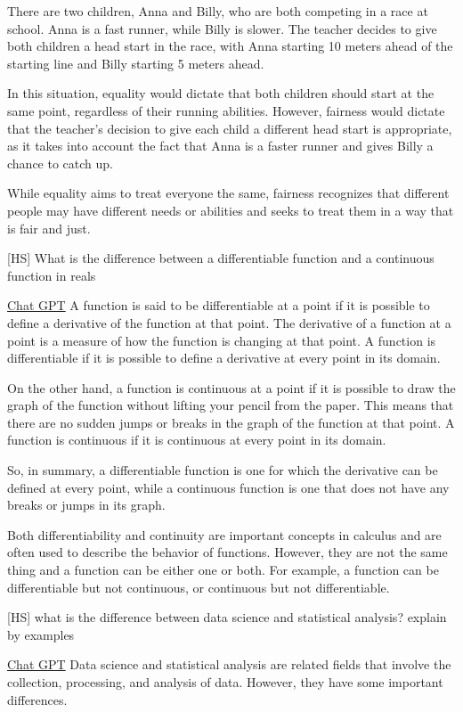 \documentclass[
]{book}
\theoremstyle{definition}
\theoremstyle{definition}
\theoremstyle{definition}
\theoremstyle{definition}
\theoremstyle{remark}
\begin{document}
There are two children, Anna and Billy, who are both competing in a race at school. Anna is a fast runner, while Billy is slower. The teacher decides to give both children a head start in the race, with Anna starting 10 meters ahead of the starting line and Billy starting 5 meters ahead.

In this situation, equality would dictate that both children should start at the same point, regardless of their running abilities. However, fairness would dictate that the teacher's decision to give each child a different head start is appropriate, as it takes into account the fact that Anna is a faster runner and gives Billy a chance to catch up.

While equality aims to treat everyone the same, fairness recognizes that different people may have different needs or abilities and seeks to treat them in a way that is fair and just.

{[}HS{]} What is the difference between a differentiable function and a continuous function in reals

\protect\hyperlink{chatgpt}{Chat GPT} A function is said to be differentiable at a point if it is possible to define a derivative of the function at that point. The derivative of a function at a point is a measure of how the function is changing at that point. A function is differentiable if it is possible to define a derivative at every point in its domain.

On the other hand, a function is continuous at a point if it is possible to draw the graph of the function without lifting your pencil from the paper. This means that there are no sudden jumps or breaks in the graph of the function at that point. A function is continuous if it is continuous at every point in its domain.

So, in summary, a differentiable function is one for which the derivative can be defined at every point, while a continuous function is one that does not have any breaks or jumps in its graph.

Both differentiability and continuity are important concepts in calculus and are often used to describe the behavior of functions. However, they are not the same thing and a function can be either one or both. For example, a function can be differentiable but not continuous, or continuous but not differentiable.

{[}HS{]} what is the difference between data science and statistical analysis? explain by examples

\protect\hyperlink{chatgpt}{Chat GPT} Data science and statistical analysis are related fields that involve the collection, processing, and analysis of data. However, they have some important differences.
\end{document}
